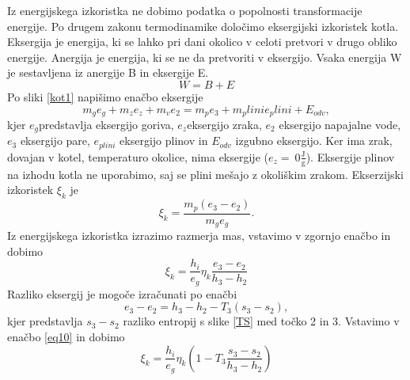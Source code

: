 \documentclass[a4paper,10pt]{article}
\begin{document}
\begin{multicols}{2}
Iz energijskega izkoristka ne dobimo podatka o popolnosti transformacije energije. Po drugem zakonu termodinamike določimo eksergijski izkoristek kotla. Eksergija je energija, ki se lahko pri dani okolico v celoti pretvori v drugo obliko energije. Anergija je energija, ki se ne da pretvoriti v eksergijo.
Vsaka energija W je sestavljena iz anergije B  in eksergije E.\citep{Orel}
\begin{equation}
	W=B+E
\end{equation}
Po sliki \ref{kot1} napišimo enačbo eksergije
\begin{equation}
	m_g e_g+m_z e_z+m_v e_2=m_p e_3+m_plini e_plini+E_{odv},
\end{equation}
kjer $e_g$predstavlja eksergijo goriva, $e_z$eksergijo zraka, $e_2$ eksergijo napajalne vode, $e_3$ eksergijo pare, $e_{plini}$ eksergijo plinov in $E_{odv}$ izgubno eksergijo. Ker ima zrak, dovajan v kotel, temperaturo okolice, nima eksergije ($e_z=~0\frac{\mathrm{J}}{\mathrm{g}}$). Eksergije plinov na izhodu kotla ne uporabimo, saj se plini mešajo z okoliškim zrakom. Ekserzijski izkoristek $\xi_k$ je
\begin{equation}
	\xi_k=\frac{m_p(e_3-e_2)}{m_ge_g}.
\end{equation}
Iz energijskega izkoristka izrazimo razmerja mas, vstavimo v zgornjo enačbo in dobimo
\begin{equation}
	\xi_k=\frac{h_i}{e_g}\eta_k\frac{e_3-e_2}{h_3-h_2}
\label{eq10}
\end{equation}
Razliko eksergij je mogoče izračunati po enačbi
\begin{equation}
	e_3-e_2=h_3-h_2-T_3 (s_3-s_2),
\end{equation}
kjer predstavlja $s_3-s_2$ razliko entropij s slike \ref{TS} med točko 2 in 3. Vstavimo v enačbo \ref{eq10} in dobimo
\begin{equation}
	\xi_k=\frac{h_i}{e_g}\eta_k(1-T_3\frac{s_3-s_2}{h_3-h_2})
\end{equation}


\end{multicols}
\end{document}
